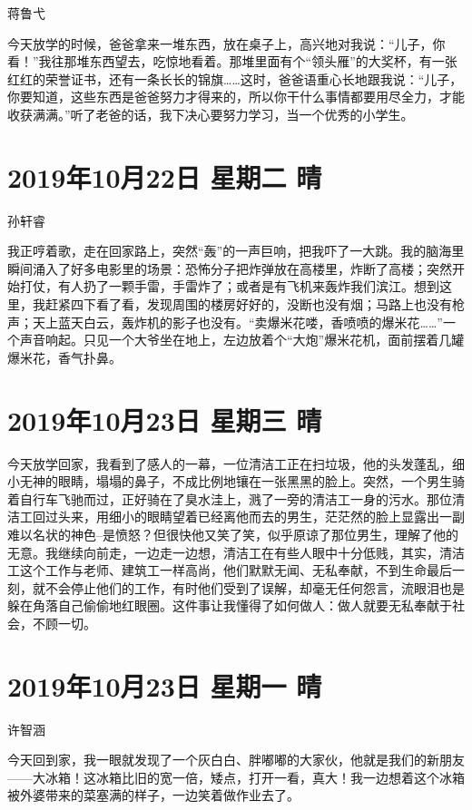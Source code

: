 蒋鲁弋

今天放学的时候，爸爸拿来一堆东西，放在桌子上，高兴地对我说：``儿子，你看！''我往那堆东西望去，吃惊地看着。那堆里面有个``领头雁''的大奖杯，有一张红红的荣誉证书，还有一条长长的锦旗\ldots\ldots 这时，爸爸语重心长地跟我说：``儿子，你要知道，这些东西是爸爸努力才得来的，所以你干什么事情都要用尽全力，才能收获满满。''听了老爸的话，我下决心要努力学习，当一个优秀的小学生。

\section{2019年10月22日 星期二 晴}

孙轩睿

我正哼着歌，走在回家路上，突然``轰''的一声巨响，把我吓了一大跳。我的脑海里瞬间涌入了好多电影里的场景：恐怖分子把炸弹放在高楼里，炸断了高楼；突然开始打仗，有人扔了一颗手雷，手雷炸了；或者是有飞机来轰炸我们滨江。想到这里，我赶紧四下看了看，发现周围的楼房好好的，没断也没有烟；马路上也没有枪声；天上蓝天白云，轰炸机的影子也没有。``卖爆米花喽，香喷喷的爆米花\ldots\ldots{}''一个声音响起。只见一个大爷坐在地上，左边放着个``大炮''爆米花机，面前摆着几罐爆米花，香气扑鼻。

\section{2019年10月23日 星期三 晴}

今天放学回家，我看到了感人的一幕，一位清洁工正在扫垃圾，他的头发蓬乱，细小无神的眼睛，塌塌的鼻子，不成比例地镶在一张黑黑的脸上。突然，一个男生骑着自行车飞驰而过，正好骑在了臭水洼上，溅了一旁的清洁工一身的污水。那位清洁工回过头来，用细小的眼睛望着已经离他而去的男生，茫茫然的脸上显露出一副难以名状的神色--是愤怒？但很快他又笑了笑，似乎原谅了那位男生，理解了他的无意。我继续向前走，一边走一边想，清洁工在有些人眼中十分低贱，其实，清洁工这个工作与老师、建筑工一样高尚，他们默默无闻、无私奉献，不到生命最后一刻，就不会停止他们的工作，有时他们受到了误解，却毫无任何怨言，流眼泪也是躲在角落自己偷偷地红眼圈。这件事让我懂得了如何做人：做人就要无私奉献于社会，不顾一切。

\section{2019年10月23日 星期一 晴}

许智涵

今天回到家，我一眼就发现了一个灰白白、胖嘟嘟的大家伙，他就是我们的新朋友------大冰箱！这冰箱比旧的宽一倍，矮点，打开一看，真大！我一边想着这个冰箱被外婆带来的菜塞满的样子，一边笑着做作业去了。

